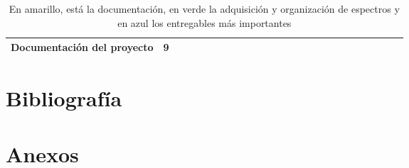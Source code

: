 \documentclass[11pt]{article}
\begin{document}
\begin{table}[htbp]
{\begin{tabular}{|l|c|l|l|l|l|l|l|l|l|l|l|l|l|l|l|l|l|l|l|l|l|l|l|l|}
Documentación del proyecto                                                          & 9                                                                            &                          &                          &                          &                          & \cellcolor[HTML]{FFFFC7} & \cellcolor[HTML]{FFFFC7} &                          &                          &                          &                          &                          & \cellcolor[HTML]{9AFF99} & \cellcolor[HTML]{9AFF99}                        &                                                 &                                                 &                          &                          &                          & \cellcolor[HTML]{DAE8FC} & \cellcolor[HTML]{DAE8FC} & \cellcolor[HTML]{DAE8FC} & \cellcolor[HTML]{DAE8FC} & \cellcolor[HTML]{DAE8FC} \\ \hline
\end{tabular}}
\caption{En amarillo, está la documentación, en verde la adquisición y organización de espectros y en azul los entregables más importantes}
\label{Cronograma}
\end{table}

\section{Bibliografía}

\section{Anexos}



\end{document}
